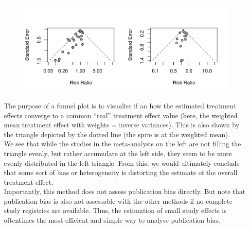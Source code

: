 \documentclass[11pt,a4paper,twoside]{book}\usepackage[]{graphicx}\usepackage[]{color}
\makeatletter
\def\maxwidth{ %
  \ifdim\Gin@nat@width>\linewidth
    \linewidth
  \else
    \Gin@nat@width
  \fi
}
\newenvironment{knitrout}{}{} %
\makeatother
\begin{document}
\begin{figure}
\begin{knitrout}
\color{fgcolor}
\includegraphics[width=\maxwidth]{figure/unnamed-chunk-1-1} 

\end{knitrout}
\end{figure}

The purpose of a funnel plot is to visualise if an how the estimated treatment effects converge to a common ``real'' treatment effect value (here, the weighted mean treatment effect with weights = inverse variances). This is also shown by the triangle depicted by the dotted line (the spire is at the weighted mean). \\
We see that while the studies in the meta-analysis on the left are not filling the triangle evenly, but rather accumulate at the left side, they seem to be more evenly distributed in the left triangle. From this, we would ultimately conclude that some sort of bias or heterogeneity is distorting the estimate of the overall treatment effect.\\
Importantly, this method does not assess publication bias directly. But note that publication bias is also not assessable with the other methods if no complete study registries are available. Thus, the estimation of small study effects is oftentimes the most efficient and simple way to analyse publication bias.
\end{document}

